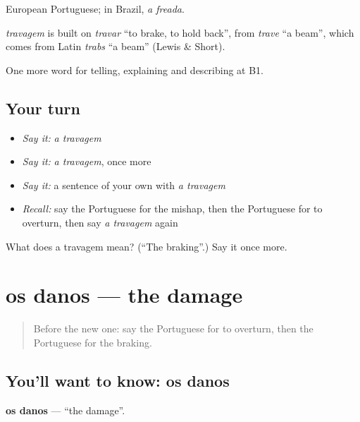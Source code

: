European Portuguese; in Brazil, \emph{a freada}.

\begin{cousinweb}
\emph{travagem} is built on \emph{travar} \textquotedblleft{}to brake, to hold back\textquotedblright{}, from \emph{trave} \textquotedblleft{}a beam\textquotedblright{}, which comes from Latin \emph{trabs} \textquotedblleft{}a beam\textquotedblright{} (Lewis \& Short).
\end{cousinweb}

\begin{grammarlens}[title={What you've built}]
One more word for telling, explaining and describing at B1.
\end{grammarlens}

\subsection*{Your turn}
\begin{itemize}
\raggedright
  \item \emph{Say it:} \emph{a travagem}
  \item \emph{Say it:} \emph{a travagem}, once more
  \item \emph{Say it:} a sentence of your own with \emph{a travagem}
  \item \emph{Recall:} say the Portuguese for the mishap, then the Portuguese for to overturn, then say \emph{a travagem} again
\end{itemize}

\begin{tcolorbox}[breakable,colback=teal!4,colframe=teal!35!black,title={Before you move on}]
What does a travagem mean? (\textquotedblleft{}The braking\textquotedblright{}.) Say it once more.
\end{tcolorbox}
\section[os danos]{os danos — the damage}

\label{lesson:PT-C300-danos}



\begin{quote}
Before the new one: say the Portuguese for to overturn, then the Portuguese for the braking.
\end{quote}

\subsection*{You'll want to know: os danos}
\textbf{os danos} — \textquotedblleft{}the damage\textquotedblright{}.

